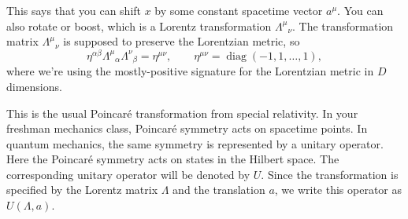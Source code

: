 This says that you can shift $x$ by some constant spacetime vector $a^\mu$.
You can also rotate or boost, which is a Lorentz transformation
$\Lambda^\mu{}_\nu$.
The transformation matrix $\Lambda^\mu{}_\nu$ is supposed to preserve the
Lorentzian metric, so
\begin{equation}
  \eta^{\alpha\beta}\Lambda^\mu{}_{\alpha}\Lambda^\nu{}_{\beta}
  =\eta^{\mu\nu},
  \qquad
  \eta^{\mu\nu}
  =\operatorname{diag}\left(-1,1,\ldots,1\right),
  \label{eq:253a-lorentz-metric}
\end{equation}
where we're using the mostly-positive signature for the Lorentzian metric in
$D$ dimensions.

This is the usual Poincaré transformation from special relativity. In your
freshman mechanics class, Poincaré symmetry acts on spacetime points. In quantum
mechanics, the same symmetry is represented by a unitary operator.
Here the Poincaré symmetry acts on states in the Hilbert space. The
corresponding unitary operator will be denoted by $U$.
Since the transformation is specified by the Lorentz matrix $\Lambda$ and the
translation $a$, we write this operator as $U(\Lambda,a)$.

